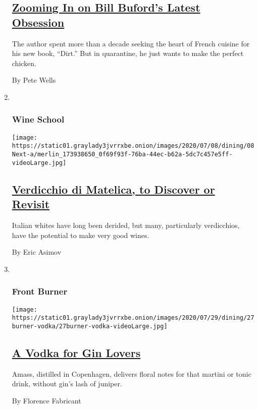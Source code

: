 \begin{enumerate}
{  \subsection{\texorpdfstring{\href{/2020/07/21/dining/bill-buford-dirt-book-chicken-recipe.html}{Zooming
  In on Bill Buford's Latest
  Obsession}}{Zooming In on Bill Buford's Latest Obsession}}\label{zooming-in-on-bill-bufords-latest-obsession}}

  The author spent more than a decade seeking the heart of French
  cuisine for his new book, ``Dirt.'' But in quarantine, he just wants
  to make the perfect chicken.

  By Pete Wells
\item ~
  \hypertarget{wine-school}{%
  \subsubsection{Wine School}\label{wine-school}}

  \texttt{[image: https://static01.graylady3jvrrxbe.onion/images/2020/07/08/dining/08Next-a/merlin\_173938650\_0f69f93f-76ba-44ec-b62a-5dc7c457e5ff-videoLarge.jpg]}

  \hypertarget{verdicchio-di-matelica-to-discover-or-revisit}{%
  \subsection{\texorpdfstring{\href{/2020/07/02/dining/drinks/wine-school-assignment-verdicchio-di-matelica.html}{Verdicchio
  di Matelica, to Discover or
  Revisit}}{Verdicchio di Matelica, to Discover or Revisit}}\label{verdicchio-di-matelica-to-discover-or-revisit}}

  Italian whites have long been derided, but many, particularly
  verdicchios, have the potential to make very good wines.

  By Eric Asimov
\item ~
  \hypertarget{front-burner}{%
  \subsubsection{Front Burner}\label{front-burner}}

  \texttt{[image: https://static01.graylady3jvrrxbe.onion/images/2020/07/29/dining/27burner-vodka/27burner-vodka-videoLarge.jpg]}

  \hypertarget{a-vodka-for-gin-lovers}{%
  \subsection{\texorpdfstring{\href{/2020/07/27/dining/amass-vodka.html}{A
  Vodka for Gin
  Lovers}}{A Vodka for Gin Lovers}}\label{a-vodka-for-gin-lovers}}

  Amass, distilled in Copenhagen, delivers floral notes for that martini
  or tonic drink, without gin's lash of juniper.

  By Florence Fabricant
\end{enumerate}


